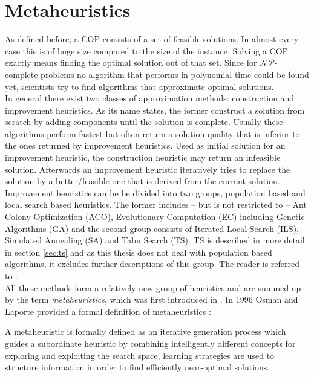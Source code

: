 \section{Metaheuristics}
As defined before, a COP consists of a set of feasible solutions. In almost every case this is of huge size compared to the size of the instance. Solving a COP exactly means finding the optimal solution out of that set. Since for $\mathcal{NP}$-complete problems no algorithm that performs in polynomial time could be found yet, scientists try to find algorithms that approximate optimal solutions.\\
In general there exist two classes of approximation methods: construction and improvement heuristics. As its name states, the former construct a solution from scratch by adding components until the solution is complete. Usually these algorithms perform fastest but often return a solution quality that is inferior to the ones returned by improvement heuristics. Used as initial solution for an improvement heuristic, the construction heuristic may return an infeasible solution. Afterwards an improvement heuristic iteratively tries to replace the solution by a better/feasible one that is derived from the current solution.\\
Improvement heuristics can be be divided into two groups, population based and local search based heuristics.\cite{blum-05} The former includes -- but is not restricted to -- Ant Colony Optimization (ACO), Evolutionary Computation (EC) including Genetic Algorithms (GA) and the second group consists of Iterated Local Search (ILS), Simulated Annealing (SA) and Tabu Search (TS). TS is described in more detail in section \ref{sec:ts} and as this thesis does not deal with population based algorithms, it excludes further descriptions of this group. The reader is referred to \cite{gendreau-10}.\\
All these methods form a relatively new group of heuristics and are summed up by the term \textit{metaheuristics}, which was first introduced in \cite{glover-86}. In 1996 Osman and Laporte provided a formal definition of metaheuristics \cite{osman-96}:
\begin{definition}[Metaheuristic]
A metaheuristic is formally defined as an iterative generation process which guides a subordinate heuristic by combining intelligently different concepts for exploring and exploiting the search space, learning strategies are used to structure information in order to find efficiently near-optimal solutions.
\end{definition}
